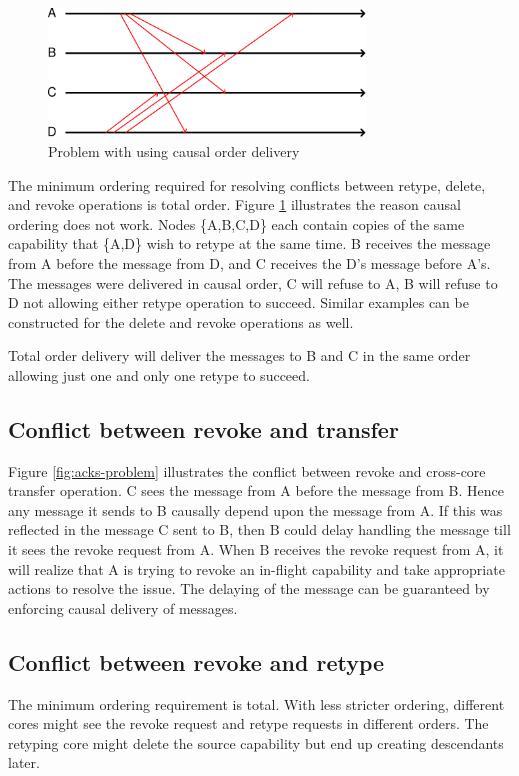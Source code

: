 \documentclass[a4paper,twoside]{report} %
\begin{document}
\begin{figure}[t]
 \includegraphics[width=0.75\textwidth]{causal-problem.pdf}
 \caption{Problem with using causal order
   delivery}\label{fig:causal-problem}
\end{figure}

The minimum ordering required for resolving conflicts between retype,
delete, and revoke operations is total order. Figure
\ref{fig:causal-problem} illustrates the reason causal ordering does
not work. Nodes \{A,B,C,D\} each contain copies of the same capability
that \{A,D\} wish to retype at the same time. B receives the message
from A before the message from D, and C receives the D's message
before A's. The messages were delivered in causal order, C will refuse
to A, B will refuse to D not allowing either retype operation to
succeed. Similar examples can be constructed for the delete and revoke
operations as well.

Total order delivery will deliver the messages to B and C in the same
order allowing just one and only one retype to succeed.

\subsection{Conflict between revoke and transfer}
Figure \ref{fig:acks-problem} illustrates the conflict between revoke
and cross-core transfer operation. C sees the message from A before
the message from B. Hence any message it sends to B causally depend
upon the message from A. If this was reflected in the message C sent
to B, then B could delay handling the message till it sees the revoke
request from A. When B receives the revoke request from A, it will
realize that A is trying to revoke an in-flight capability and take
appropriate actions to resolve the issue. The delaying of the message
can be guaranteed by enforcing causal delivery of messages.

\subsection{Conflict between revoke and retype}
The minimum ordering requirement is total. With less stricter
ordering, different cores might see the revoke request and retype
requests in different orders. The retyping core might delete the
source capability but end up creating descendants later.
\end{document}

